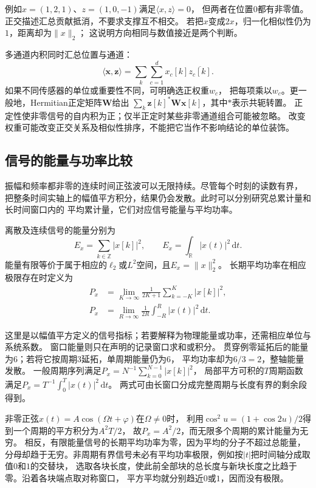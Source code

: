 例如$x=(1,2,1)$、$z=(1,0,-1)$满足$\langle x,z\rangle=0$，
但两者在位置$0$都有非零值。正交描述汇总贡献抵消，不要求支撑互不相交。
若把$x$变成$2x$，归一化相似性仍为$1$，距离却为$\|x\|_2$；
这说明方向相同与数值接近是两个判断。

多通道内积同时汇总位置与通道：
\[
  \langle\bm x,\bm z\rangle
  =\sum_k\sum_{c=1}^d x_c[k]\overline{z_c[k]}.
\]
如果不同传感器的单位或重要性不同，可明确选正权重$w_c$，
把每项乘以$w_c$。更一般地，Hermitian正定矩阵$\bm W$给出
$\sum_k\bm z[k]^*\bm W\bm x[k]$，其中$*$表示共轭转置。
正定性使非零信号的自内积为正；仅半正定时某些非零通道组合可能被忽略。
改变权重可能改变正交关系及相似性排序，不能把它当作不影响结论的单位装饰。

\subsection{信号的能量与功率比较}

振幅和频率都非零的连续时间正弦波可以无限持续。尽管每个时刻的读数有界，
把整条时间实轴上的幅值平方积分，结果仍会发散。此时可以分别研究总累计量和长时间窗口内的
平均累计量，它们对应信号能量与平均功率。
\begin{definition}[信号能量与平均功率]
  \label{def:signal-energy-power}
  离散及连续信号的能量分别为
  \[
    E_x=\sum_{k\in\mathbb Z}|x[k]|^2,\qquad
    E_x=\int_{\mathbb R}|x(t)|^2\,\mathrm dt.
  \]
  能量有限等价于属于相应的$\ell_2$或$L^2$空间，且$E_x=\|x\|_2^2$。
  长期平均功率在相应极限存在时定义为
  \begin{align*}
    P_x&=\lim_{K\to\infty}\frac1{2K+1}\sum_{k=-K}^K|x[k]|^2,\\
    P_x&=\lim_{R\to\infty}\frac1{2R}\int_{-R}^R|x(t)|^2\,\mathrm dt.
  \end{align*}
\end{definition}

这里是以幅值平方定义的信号指标；若要解释为物理能量或功率，还需相应单位与系统系数。
窗口能量则只在声明的记录窗口求和或积分。
贯穿例零延拓后的能量为$6$；若将它按周期$3$延拓，单周期能量仍为$6$，
平均功率却为$6/3=2$，整轴能量发散。
一般周期序列满足$P_x=N^{-1}\sum_{k=0}^{N-1}|x[k]|^2$，
局部平方可积的$T$周期函数满足$P_x=T^{-1}\int_0^T|x(t)|^2\,\mathrm dt$。
两式可由长窗口分成完整周期与长度有界的剩余段得到。

非零正弦$x(t)=A\cos(\Omega t+\varphi)$在$\Omega\neq0$时，
利用$\cos^2 u=(1+\cos2u)/2$得到一个周期的平方积分为$A^2T/2$，
故$P_x=A^2/2$，而无限多个周期的累计能量为无穷。
相反，有限能量信号的长期平均功率为零，因为平均的分子不超过总能量，
分母却趋于无穷。非周期有界信号未必有平均功率极限，例如按$|t|$把时间轴分成取值$0$和$1$的交替块，
选取各块长度，使此前全部块的总长度与新块长度之比趋于零。沿着各块端点取对称窗口，
平方平均就分别趋近$0$或$1$，因而没有极限。

